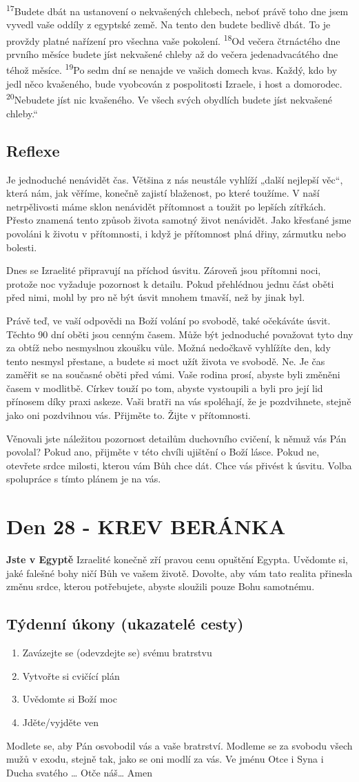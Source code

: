 \documentclass[11pt]{article}
\newcommand{\zacatekCtvrtyTyden}{
  \textbf{Jste v Egyptě} \newline
  Izraelité konečně zří pravou cenu opuštění Egypta. Uvědomte si, jaké falešné bohy ničí Bůh ve vašem životě.
Dovolte, aby vám tato realita přinesla změnu srdce, kterou potřebujete, abyste sloužili pouze Bohu samotnému.

\subsection*{Týdenní úkony (ukazatelé cesty)}
\begin{enumerate}
  \item Zavázejte se (odevzdejte se) svému bratrstvu
  \item Vytvořte si cvičící plán
  \item Uvědomte si Boží moc
  \item Jděte/vyjděte ven
\end{enumerate}
Modlete se, aby Pán osvobodil vás a vaše bratrství. \newline
Modleme se za svobodu všech mužů v exodu, stejně tak, jako se oni modlí za vás.\newline
Ve jménu Otce i Syna i Ducha svatého …  Otče náš… Amen
}
\begin{document}
{\textsuperscript{17}Budete dbát na ustanovení o nekvašených chlebech, neboť právě toho dne jsem vyvedl vaše oddíly z egyptské země. Na tento den budete bedlivě dbát. To je provždy platné nařízení pro všechna vaše pokolení.
\textsuperscript{18}Od večera čtrnáctého dne prvního měsíce budete jíst nekvašené chleby až do večera jedenadvacátého dne téhož měsíce.
\textsuperscript{19}Po sedm dní se nenajde ve vašich domech kvas. Každý, kdo by jedl něco kvašeného, bude vyobcován z pospolitosti Izraele, i host a domorodec.
\textsuperscript{20}Nebudete jíst nic kvašeného. Ve všech svých obydlích budete jíst nekvašené chleby.“
}

\subsection*{Reflexe}
Je jednoduché nenávidět čas. Většina z nás neustále vyhlíží „další nejlepší věc“, která nám, jak věříme, konečně zajistí
blaženost, po které toužíme. V naší netrpělivosti máme sklon nenávidět přítomnost a toužit po lepších zítřkách. Přesto znamená
tento způsob života samotný život nenávidět. Jako křesťané jsme povoláni k životu v přítomnosti, i když je přítomnost plná
dřiny, zármutku nebo bolesti.

Dnes se Izraelité připravují na příchod úsvitu. Zároveň jsou přítomni noci, protože noc vyžaduje pozornost k detailu. Pokud
přehlédnou jednu část oběti před nimi, mohl by pro ně být úsvit mnohem tmavší, než by jinak byl.

Právě teď, ve vaší odpovědi na Boží volání po svobodě, také očekáváte úsvit. Těchto 90 dní oběti jsou cenným časem. Může
být jednoduché považovat tyto dny za obtíž nebo nesmyslnou zkoušku vůle. Možná nedočkavě vyhlížíte den, kdy tento
nesmysl přestane, a budete si moct užít života ve svobodě. Ne. Je čas zaměřit se na současné oběti před vámi. Vaše rodina
prosí, abyste byli změněni časem v modlitbě. Církev touží po tom, abyste vystoupili a byli pro její lid přínosem díky praxi
askeze. Vaši bratři na vás spoléhají, že je pozdvihnete, stejně jako oni pozdvihnou vás. Přijměte to. Žijte v přítomnosti.

Věnovali jste náležitou pozornost detailům duchovního cvičení, k němuž vás Pán povolal? Pokud ano, přijměte v této chvíli
ujištění o Boží lásce. Pokud ne, otevřete srdce milosti, kterou vám Bůh chce dát. Chce vás přivést k úsvitu. Volba spolupráce
s tímto plánem je na vás.

\newpage
\section{Den 28 - KREV BERÁNKA}
\zacatekCtvrtyTyden
\end{document}
